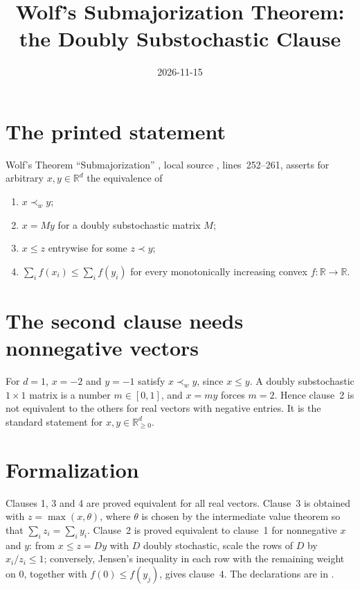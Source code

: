 \documentclass{article}
\title{Wolf's Submajorization Theorem: the Doubly Substochastic Clause}
\author{}
\date{2026-11-15}
\begin{document}
\maketitle
{}

\section{The printed statement}
Wolf's Theorem ``Submajorization'' \cite{Wolf2012Quantum}, local source
, lines~252--261,
asserts for arbitrary $x,y\in\mathbb R^d$ the equivalence of
\begin{enumerate}
    \item $x\prec_wy$;
    \item $x=My$ for a doubly substochastic matrix $M$;
    \item $x\le z$ entrywise for some $z\prec y$;
    \item $\sum_if(x_i)\le\sum_if(y_i)$ for every monotonically increasing convex
        $f:\mathbb R\to\mathbb R$.
\end{enumerate}

\section{The second clause needs nonnegative vectors}
For $d=1$, $x=-2$ and $y=-1$ satisfy $x\prec_wy$, since $x\le y$. A doubly
substochastic $1\times1$ matrix is a number $m\in[0,1]$, and $x=my$ forces
$m=2$. Hence clause~2 is not equivalent to the others for real vectors with
negative entries. It is the standard statement for $x,y\in\mathbb R^d_{\ge0}$.

\section{Formalization}
Clauses 1, 3 and 4 are proved equivalent for all real vectors. Clause~3 is
obtained with $z=\max(x,\theta)$, where $\theta$ is chosen by the intermediate
value theorem so that $\sum_iz_i=\sum_iy_i$. Clause~2 is proved equivalent to
clause~1 for nonnegative $x$ and $y$: from $x\le z=Dy$ with $D$ doubly
stochastic, scale the rows of $D$ by $x_i/z_i\le1$; conversely, Jensen's
inequality in each row with the remaining weight on $0$, together with
$f(0)\le f(y_j)$, gives clause~4. The declarations are in
.



\end{document}
